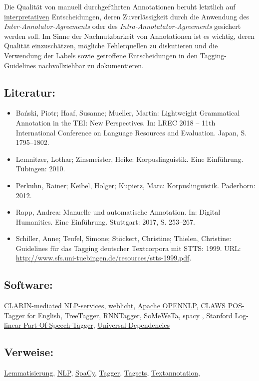 \documentclass{article}
\begin{document}
        Die Qualität von manuell durchgeführten Annotationen beruht letztlich auf \href{http://gams.uni-graz.at/o:konde.100}{interpretativen} Entscheidungen, deren Zuverlässigkeit durch die Anwendung des \emph{Inter-Annotator-Agreements} oder des \emph{Intra-Annotatator-Agreements} gesichert werden soll. Im Sinne der Nachnutzbarkeit von Annotationen ist es wichtig, deren Qualität einzuschätzen, mögliche Fehlerquellen zu diskutieren und die Verwendung der Labels sowie getroffene Entscheidungen in den Tagging-Guidelines nachvollziehbar zu dokumentieren.\\
            
        \subsection*{Literatur:}\begin{itemize}\item Bański, Piotr; Haaf, Susanne; Mueller, Martin: Lightweight Grammatical Annotation in the TEI: New Perspectives. In: LREC 2018 – 11th International Conference on Language Resources and Evaluation. Japan, S. 1795–1802.\item Lemnitzer, Lothar; Zinsmeister, Heike: Korpuslinguistik. Eine Einführung. Tübingen: 2010.\item Perkuhn, Rainer; Keibel, Holger; Kupietz, Marc: Korpuslinguistik. Paderborn: 2012.\item Rapp, Andrea: Manuelle und automatische Annotation. In: Digital Humanities. Eine Einführung. Stuttgart: 2017, S. 253–267.\item Schiller, Anne; Teufel, Simone; Stöckert, Christine; Thielen, Christine: Guidelines für das Tagging deutscher Textcorpora mit STTS: 1999. URL: \url{http://www.sfs.uni-tuebingen.de/resources/stts-1999.pdf}.\end{itemize}\subsection*{Software:}\href{https://www.clarin.eu/content/services}{CLARIN-mediated NLP-services}, \href{https://weblicht.sfs.uni-tuebingen.de/weblicht/}{weblicht}, \href{http://opennlp.apache.org/}{Apache OPENNLP}, \href{http://ucrel.lancs.ac.uk/claws/}{CLAWS POS-Tagger for English}, \href{https://www.cis.uni-muenchen.de/~schmid/tools/TreeTagger/}{TreeTagger}, \href{https://www.cis.uni-muenchen.de/~schmid/tools/RNNTagger/}{RNNTagger}, \href{https://github.com/tsproisl/SoMeWeTa}{SoMeWeTa}, \href{https://spacy.io/}{spacy }, \href{https://nlp.stanford.edu/software/tagger.shtml}{Stanford Log-linear Part-Of-Speech-Tagger}, \href{https://universaldependencies.org/}{Universal Dependencies}\subsection*{Verweise:}\href{https://gams.uni-graz.at/o:konde.115}{Lemmatisierung}, \href{https://gams.uni-graz.at/o:konde.145}{NLP}, \href{https://gams.uni-graz.at/o:konde.170}{SpaCy}, \href{https://gams.uni-graz.at/o:konde.176}{Tagger}, \href{https://gams.uni-graz.at/o:konde.177}{Tagsets}, \href{https://gams.uni-graz.at/o:konde.17}{Textannotation}, 
\end{document}
